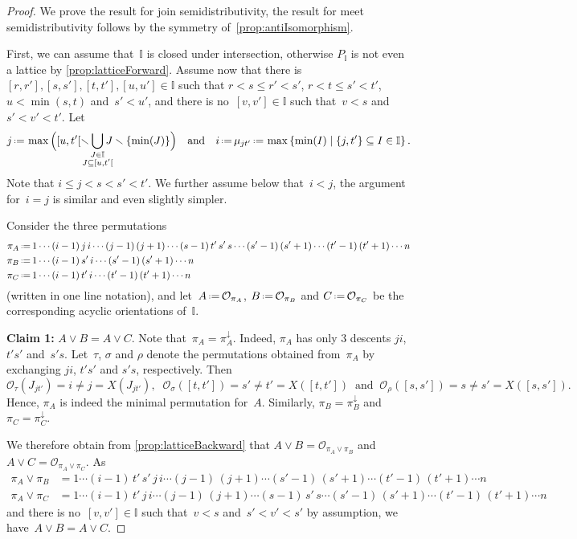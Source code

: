 \documentclass{amsart}
\theoremstyle{definition}
\newcommand{\set}[2]{\left\{ #1 \;\middle|\; #2 \right\}} %
\newcommand{\ssm}{\smallsetminus} %
\newcommand{\eqdef}{\mbox{\,\raisebox{0.2ex}{\scriptsize\ensuremath{\mathrm:}}\ensuremath{=}\,}} %
\newcommand{\para}[1]{\medskip\noindent\textbf{#1}} %
\newcommand{\join}{\vee} %
\newcommand{\projDown}{\pi^\downarrow} %
\newcommand{\Or}{\mathcal O}  %
\newcommand{\II}{\mathbb I} %
\begin{document}
\begin{proof}
We prove the result for join semidistributivity, the result for meet semidistributivity follows by the symmetry of~\cref{prop:antiIsomorphism}.

First, we can assume that~$\II$ is closed under intersection, otherwise $P_\II$ is not even a lattice by \cref{prop:latticeForward}.
Assume now that there is~$[r,r'], [s,s'], [t,t'], [u,u'] \in \II$ such that $r < s \le r' < s'$, $r < t \le s' < t'$, $u < \min(s, t)$ and~$s' < u'$, and there is no~$[v,v'] \in \II$ such that~$v < s$ and~${s' < v' < t'}$.
Let
\[
j \eqdef \max \Big( [u,t'[ \ssm \!\!\!\!\! \bigcup_{\substack{J \in \II \\ J \subseteq [u,t'[}} \!\!\!\!\! J \ssm \{\min(J)\} \Big)
\quad\text{and}\quad
i \eqdef \mu_{jt'} \eqdef \max\set{\min(I)}{\{j,t'\} \subseteq I \in \II}.
\]
Note that $i \le j < s < s' < t'$.
We further assume below that~$i < j$, the argument for~$i = j$ is similar and even slightly simpler.

Consider the three permutations
\begin{align*}
\pi_A & \eqdef 1 \cdots (i-1) \, j \, i \cdots (j-1) \, (j+1) \cdots (s-1) \, t' \, s' \, s \cdots (s'-1) \, (s'+1) \cdots (t'-1) \, (t'+1) \cdots n \\
\pi_B & \eqdef 1 \cdots (i-1) \, s' \, i \cdots (s'-1) \, (s'+1) \cdots n \\
\pi_C & \eqdef 1 \cdots (i-1) \, t' \, i \cdots (t'-1) \, (t'+1) \cdots n
\end{align*}
(written in one line notation), and let~$A \eqdef \Or_{\pi_A}$, $B \eqdef \Or_{\pi_B}$ and $C \eqdef \Or_{\pi_C}$ be the corresponding acyclic orientations of~$\II$.

\para{Claim 1:} $A \join B = A \join C$.
%
Note that~$\pi_A = \projDown_A$.
Indeed, $\pi_A$ has only $3$ descents $ji$, $t's'$ and~$s's$.
Let~$\tau$, $\sigma$ and $\rho$ denote the permutations obtained from~$\pi_A$ by exchanging $ji$, $t's'$ and $s's$, respectively.
Then
\[
\Or_{\tau}(J_{jt'}) = i \ne j = X(J_{jt'}),
\;\;
\Or_{\sigma}([t,t']) = s' \ne t' = X([t,t'])
\;\;\text{and}\;\;
\Or_{\rho}([s,s']) = s \ne s' = X([s,s']).
\]
Hence, $\pi_A$ is indeed the minimal permutation for~$A$.
Similarly, $\pi_B = \projDown_B$ and $\pi_C = \projDown_C$.

We therefore obtain from \cref{prop:latticeBackward} that
$A \join B = \Or_{\pi_A \join \pi_B}$ and $A \join C = \Or_{\pi_A \join \pi_C}$.
As
\begin{align*}
\pi_A \join \pi_B & = 1 \cdots (i-1) \, t' \, s' \, j \, i \cdots (j-1) \, (j+1) \cdots (s'-1) \, (s'+1) \cdots (t'-1) \, (t'+1) \cdots n \\
\pi_A \join \pi_C & = 1 \cdots (i-1) \, t' \, j \, i \cdots (j-1) \, (j+1) \cdots (s-1) \, s' \, s \cdots (s'-1) \, (s'+1) \cdots (t'-1) \, (t'+1) \cdots n
\end{align*}
and there is no~$[v,v'] \in \II$ such that~$v < s$ and~$s' < v' < s'$ by assumption, we have~$A \join B = A \join C$.


\end{proof}
\end{document}
